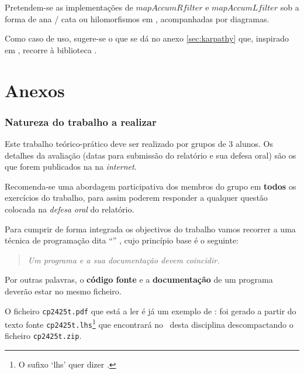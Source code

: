 \documentclass[11pt, a4paper, fleqn]{article}
\newcommand{\Varid}[1]{\mathit{#1}}
\begin{document}
Pretendem-se as implementações de \ensuremath{\Varid{mapAccumRfilter}} e \ensuremath{\Varid{mapAccumLfilter}} sob a forma de ana / cata ou hilomorfismos em \Haskell, acompanhadas por diagramas.

Como caso de uso, sugere-se o que se dá no anexo \ref{sec:karpathy} que, inspirado em \cite{Ka15}, recorre à biblioteca \DataMatrix.

\Problema

\begin{center}
\end{center}

\Problema

\begin{center}
\end{center}

\RNNs

\newpage
\part*{Anexos}

\appendix

\section{Natureza do trabalho a realizar}
\label{sec:documentacao}
Este trabalho teórico-prático deve ser realizado por grupos de 3 alunos.
Os detalhes da avaliação (datas para submissão do relatório e sua defesa
oral) são os que forem publicados na  na \emph{internet}.

Recomenda-se uma abordagem participativa dos membros do grupo em \textbf{todos}
os exercícios do trabalho, para assim poderem responder a qualquer questão
colocada na \emph{defesa oral} do relatório.

Para cumprir de forma integrada os objectivos do trabalho vamos recorrer
a uma técnica de programa\-ção dita ``'' \cite{Kn92}, cujo
princípio base é o seguinte:
%
\begin{quote}\em
	Um programa e a sua documentação devem coincidir.
\end{quote}
%
Por outras palavras, o \textbf{código fonte} e a \textbf{documentação} de um
programa deverão estar no mesmo ficheiro.

O ficheiro \texttt{cp2425t.pdf} que está a ler é já um exemplo de
: foi gerado a partir do texto fonte
\texttt{cp2425t.lhs}\footnote{O sufixo `lhs' quer dizer
\emph{}.} que encontrará no \MaterialPedagogico\
desta disciplina des\-com\-pactando o ficheiro \texttt{cp2425t.zip}.
\end{document}
